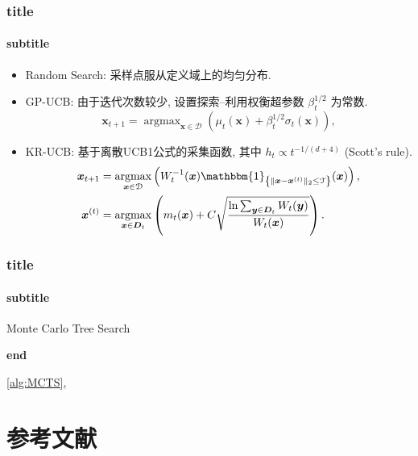 \documentclass[aspectratio=169]{beamer}
\newcommand{\set}[1]{\left\{#1\right\}}
\DeclareMathOperator*{\argmax}{argmax}
\begin{document}
\begin{frame}
    \frametitle{title}
    \framesubtitle{subtitle}
    
    \begin{itemize}
        \item Random Search: 采样点服从定义域上的均匀分布.
        \item GP-UCB: 由于迭代次数较少, 设置探索--利用权衡超参数 $\beta_t^{1/2}$ 为常数.
        \begin{equation*}
            \bm{x}_{t+1} = \argmax_{\bm{x} \in \mathcal{D}} \left( \mu_t(\bm{x}) + \beta_t^{1/2} \sigma_t(\bm{x}) \right),
        \end{equation*}
        \item KR-UCB: 基于离散UCB1公式的采集函数, 其中 $h_t \propto t^{-1/(d+4)}$ (Scott's rule).
        \begin{align*}
            \bm{x}_{t+1} &= \argmax_{\bm{x} \in \mathcal{D}} \left( W_t^{-1}(\bm{x}) \mathbbm{1}_{\set{\| \bm{x} - \bm{x}^{(t)} \|_2 \le \mathcal{T}}}(\bm{x}) \right), 
            \\
            \bm{x}^{(t)} &= \argmax_{\bm{x} \in \bm{D}_t} \left( m_t(\bm{x}) + C \sqrt{\dfrac{\ln \sum_{\bm{y} \in \bm{D}_t} W_t(\bm{y})}{W_t(\bm{x})}} \right).
        \end{align*}
    \end{itemize}
\end{frame}


\begin{frame}
    \frametitle{title}
    \framesubtitle{subtitle}

    \begin{algorithm}[H]
        \caption{Monte Carlo Tree Search}\label{alg:MCTS}
    
        \textbf{end}
    \end{algorithm}
    \cref{alg:MCTS}, \cite{miktex}
\end{frame}



\section{参考文献}

\begin{frame}[allowframebreaks]    
    \nocite{*} %
    \printbibliography[heading=none] %
\end{frame}



\renewcommand{\thefootnote}{\faEnvelopeO} %
\makebottom
\end{document}

